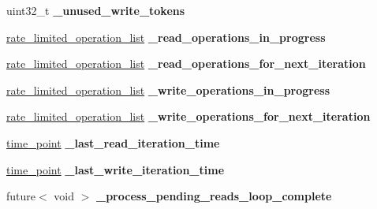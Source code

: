 \begin{DoxyCompactItemize}
uint32\+\_\+t {\bfseries \+\_\+unused\+\_\+write\+\_\+tokens}
\item 
\mbox{\label{classfc_1_1detail_1_1rate__limiting__group__impl_aa02fce050432e868fa63a1817d639b20}} 
\mbox{\hyperlink{classstd_1_1list}{rate\+\_\+limited\+\_\+operation\+\_\+list}} {\bfseries \+\_\+read\+\_\+operations\+\_\+in\+\_\+progress}
\item 
\mbox{\label{classfc_1_1detail_1_1rate__limiting__group__impl_ac6c58ba1dce6c246b610978efaa953f5}} 
\mbox{\hyperlink{classstd_1_1list}{rate\+\_\+limited\+\_\+operation\+\_\+list}} {\bfseries \+\_\+read\+\_\+operations\+\_\+for\+\_\+next\+\_\+iteration}
\item 
\mbox{\label{classfc_1_1detail_1_1rate__limiting__group__impl_a3fedce7e9ee44f57af077391af013cd4}} 
\mbox{\hyperlink{classstd_1_1list}{rate\+\_\+limited\+\_\+operation\+\_\+list}} {\bfseries \+\_\+write\+\_\+operations\+\_\+in\+\_\+progress}
\item 
\mbox{\label{classfc_1_1detail_1_1rate__limiting__group__impl_a4eab5449ce828620059a63481584b914}} 
\mbox{\hyperlink{classstd_1_1list}{rate\+\_\+limited\+\_\+operation\+\_\+list}} {\bfseries \+\_\+write\+\_\+operations\+\_\+for\+\_\+next\+\_\+iteration}
\item 
\mbox{\label{classfc_1_1detail_1_1rate__limiting__group__impl_ab27d2289d9b796a3ad2eb6948d17f752}} 
\mbox{\hyperlink{classfc_1_1time__point}{time\+\_\+point}} {\bfseries \+\_\+last\+\_\+read\+\_\+iteration\+\_\+time}
\item 
\mbox{\label{classfc_1_1detail_1_1rate__limiting__group__impl_a66e7e14cddeacf23b2cc907f2b75cd05}} 
\mbox{\hyperlink{classfc_1_1time__point}{time\+\_\+point}} {\bfseries \+\_\+last\+\_\+write\+\_\+iteration\+\_\+time}
\item 
\mbox{\label{classfc_1_1detail_1_1rate__limiting__group__impl_ac9074d5e5c064707c52bcb8973639519}} 
future$<$ void $>$ {\bfseries \+\_\+process\+\_\+pending\+\_\+reads\+\_\+loop\+\_\+complete}

\end{DoxyCompactItemize}
